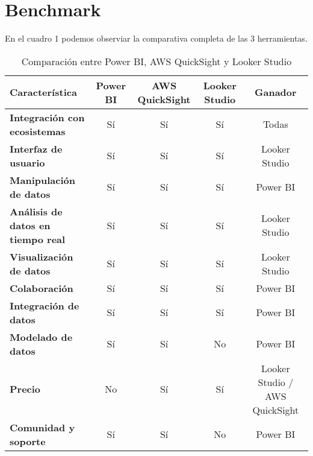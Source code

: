 \section{Benchmark}

En el cuadro 1 podemos observiar la comparativa completa de las 3 herramientas.

\begin{table*}[h!]
    \centering
    \caption{Comparación entre Power BI, AWS QuickSight y Looker Studio}
    \renewcommand{\arraystretch}{1.5} %
    \setlength{\tabcolsep}{0.7\tabcolsep} %
    \begin{tabular}{|l|c|c|c|c|}
        \hline
        \textbf{Característica} & \textbf{Power BI} & \textbf{AWS QuickSight} & \textbf{Looker Studio} & \textbf{Ganador} \\ \hline
        \textbf{Integración con ecosistemas} & Sí & Sí & Sí & Todas \\ \hline
        \textbf{Interfaz de usuario} & Sí & Sí & Sí & Looker Studio \\ \hline
        \textbf{Manipulación de datos} & Sí & Sí & Sí & Power BI \\ \hline
        \textbf{Análisis de datos en tiempo real} & Sí & Sí & Sí & Looker Studio \\ \hline
        \textbf{Visualización de datos} & Sí & Sí & Sí & Looker Studio \\ \hline
        \textbf{Colaboración} & Sí & Sí & Sí & Power BI \\ \hline
        \textbf{Integración de datos} & Sí & Sí & Sí & Power BI \\ \hline
        \textbf{Modelado de datos} & Sí & Sí & No & Power BI \\ \hline
        \textbf{Precio} & No & Sí & Sí & Looker Studio / AWS QuickSight \\ \hline
        \textbf{Comunidad y soporte} & Sí & Sí & No & Power BI \\ \hline
    \end{tabular}
\end{table*}
    